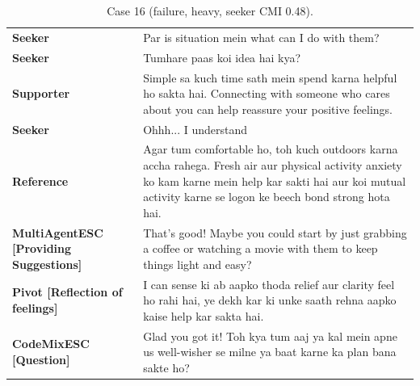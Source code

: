 \begin{table}[t]
\centering\footnotesize
\caption{Case 16 (failure, heavy, seeker CMI 0.48).}
\label{tab:case16}
\begin{tabular}{@{}p{}p{}@{}}
\toprule
\textbf{Seeker} & Par is situation mein what can I do with them? \\
\textbf{Seeker} & Tumhare paas koi idea hai kya? \\
\textbf{Supporter} & Simple sa kuch time sath mein spend karna helpful ho sakta hai. Connecting with someone who cares about you can help reassure your positive feelings. \\
\textbf{Seeker} & Ohhh... I understand \\
\textbf{Reference} & Agar tum comfortable ho, toh kuch outdoors karna accha rahega. Fresh air aur physical activity anxiety ko kam karne mein help kar sakti hai aur koi mutual activity karne se logon ke beech bond strong hota hai. \\
\textbf{MultiAgentESC [Providing Suggestions]} & That's good! Maybe you could start by just grabbing a coffee or watching a movie with them to keep things light and easy? \\
\textbf{Pivot [Reflection of feelings]} & I can sense ki ab aapko thoda relief aur clarity feel ho rahi hai, ye dekh kar ki unke saath rehna aapko kaise help kar sakta hai. \\
\textbf{CodeMixESC [Question]} & Glad you got it! Toh kya tum aaj ya kal mein apne us well-wisher se milne ya baat karne ka plan bana sakte ho? \\
\bottomrule
\end{tabular}
\end{table}

